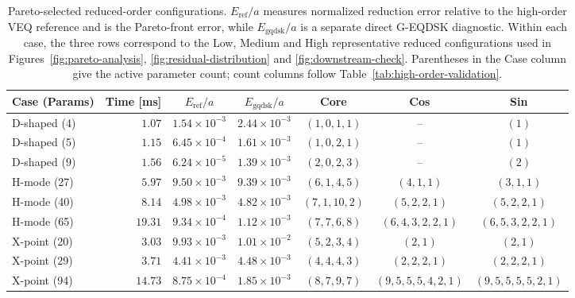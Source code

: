 \documentclass[final, 3p, times]{elsarticle}
\newcommand{\tableformat}{\centering\small}
\begin{document}
\begin{table}[tb]
    \caption{Pareto-selected reduced-order configurations. $E_{\mathrm{ref}}/a$ measures normalized reduction error relative to the high-order VEQ reference and is the Pareto-front error, while $E_{\mathrm{gqdsk}}/a$ is a separate direct G-EQDSK diagnostic. Within each case, the three rows correspond to the Low, Medium and High representative reduced configurations used in Figures~\ref{fig:pareto-analysis}, \ref{fig:residual-distribution} and \ref{fig:downstream-check}. Parentheses in the Case column give the active parameter count; count columns follow Table~\ref{tab:high-order-validation}.}
    \tableformat
    \begin{tabular}{l r c c c c c}
        \hline
        Case (Params) & Time [ms] & $E_{\mathrm{ref}}/a$ & $E_{\mathrm{gqdsk}}/a$ & Core         & Cos               & Sin               \\
        \hline
        D-shaped (4)  & $1.07$    & $1.54\times 10^{-3}$ & $2.44\times 10^{-3}$   & $(1,0,1,1)$  & --                & $(1)$             \\
        D-shaped (5)  & $1.15$    & $6.45\times 10^{-4}$ & $1.61\times 10^{-3}$   & $(1,0,2,1)$  & --                & $(1)$             \\
        D-shaped (9)  & $1.56$    & $6.24\times 10^{-5}$ & $1.39\times 10^{-3}$   & $(2,0,2,3)$  & --                & $(2)$             \\
        H-mode (27)   & $5.97$    & $9.50\times 10^{-3}$ & $9.39\times 10^{-3}$   & $(6,1,4,5)$  & $(4,1,1)$         & $(3,1,1)$         \\
        H-mode (40)   & $8.14$    & $4.98\times 10^{-3}$ & $4.82\times 10^{-3}$   & $(7,1,10,2)$ & $(5,2,2,1)$       & $(5,2,2,1)$       \\
        H-mode (65)   & $19.31$   & $9.34\times 10^{-4}$ & $1.12\times 10^{-3}$   & $(7,7,6,8)$  & $(6,4,3,2,2,1)$   & $(6,5,3,2,2,1)$   \\
        X-point (20)  & $3.03$    & $9.93\times 10^{-3}$ & $1.01\times 10^{-2}$   & $(5,2,3,4)$  & $(2,1)$           & $(2,1)$           \\
        X-point (29)  & $3.71$    & $4.41\times 10^{-3}$ & $4.48\times 10^{-3}$   & $(4,4,4,3)$  & $(2,2,2,1)$       & $(2,2,2,1)$       \\
        X-point (94)  & $14.73$   & $8.75\times 10^{-4}$ & $1.85\times 10^{-3}$   & $(8,7,9,7)$  & $(9,5,5,5,4,2,1)$ & $(9,5,5,5,5,2,1)$ \\
        \hline
    \end{tabular}
    \label{tab:pareto-configurations}
\end{table}
\end{document}
